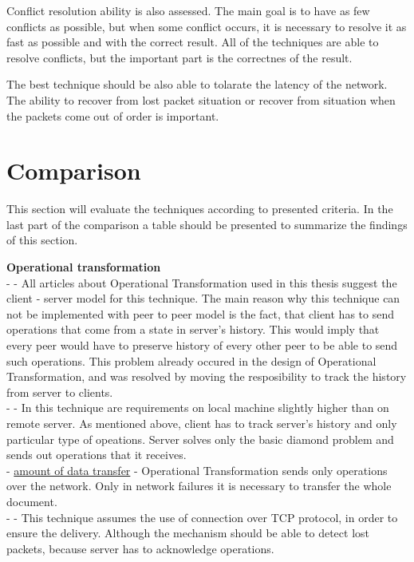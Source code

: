 \documentclass[12pt,oneside]{fithesis2}
\begin{document}
\par Conflict resolution ability is also assessed. The main goal is to have as few conflicts as possible, but when some conflict occurs, it is necessary to resolve it as fast as possible and with the correct result. All of the techniques are able to resolve conflicts, but the important part is the correctnes of the result. 
\par The best technique should be also able to tolarate the latency of the network. The ability to recover from lost packet situation or recover from situation when the packets come out of order is important. 
\section{Comparison}
\par This section will evaluate the techniques according to presented criteria. In the last part of the comparison a table should be presented to summarize the findings of this section.
\par \textbf{Operational transformation} \\
- \underline{} - All articles about Operational Transformation used in this thesis suggest the client - server model for this technique. The main reason why this technique can not be implemented with peer to peer model is the fact, that client has to send operations that come from a state in server's history. This would imply that every peer would have to preserve history of every other peer to be able to send such operations. This problem already occured in the design of Operational Transformation, and was resolved by moving the resposibility to track the history from server to clients. \\
- \underline{} - In this technique are requirements on local machine slightly higher than on remote server. As mentioned above, client has to track server's history and only particular type of opeations. Server solves only the basic diamond problem and sends out operations that it receives.\\
- \underline{amount of data transfer} - Operational Transformation sends only operations over the network. Only in network failures it is necessary to transfer the whole document.\\
- \underline{} - This technique assumes the use of connection over TCP protocol, in order to ensure the delivery. Although the mechanism should be able to detect lost packets, because server has to acknowledge operations.\\
\end{document}
